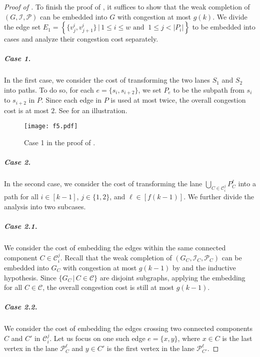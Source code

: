 \documentclass[11pt]{article}
\theoremstyle{definition}
\theoremstyle{remark}
\begin{document}
 \begin{proof}[Proof of ]
To finish the proof of , it suffices to show that the weak completion of $(G,\mathcal{I},\mathcal{P})$ can be embedded into $G$ with congestion at most $g(k)$. We divide the edge set $E_1 = \left\{ \{v_j^i, v_{j+1}^{i}\} \, | \, 1 \leq i \leq w \text{ and } \ 1 \leq j < |P_i| \right\}$ to be embedded into cases and analyze their congestion cost separately.

\subparagraph{Case 1.} In the first case, we consider the cost of transforming the two lanes $S_1$ and $S_2$ into paths. To do so, for each $e=\{s_{i}, s_{i+2}\}$, we set $P_e$ to be the subpath from $s_i$ to $s_{i+2}$ in $P$. Since each edge in $P$ is used at most twice, the overall congestion cost is at most $2$. See  for an illustration.
\begin{figure}[ht!]
    \centering
    \texttt{[image: f5.pdf]}
    \caption{Case 1 in the proof of .}
    \label{fig:f5}
\end{figure}


\subparagraph{Case 2.} In the second case, we consider the cost of transforming the lane $\bigcup_{C \in \mathcal{C}_i^j} {P}_C^\ell$ into a path for all $i \in [k-1]$, $j \in \{1,2\}$, and $\ell \in [f(k-1)]$. We further divide the analysis into two subcases. 

\subparagraph{Case 2.1.} We consider the cost of embedding the edges within the same connected component $C \in \mathcal{C}_i^j$. Recall that the weak completion of $(G_C,\mathcal{I}_C,\mathcal{P}_C)$ can be embedded into $G_C$ with congestion at most $g(k-1)$ by  and the inductive hypothesis. Since $\{G_C \, | \, C \in \mathcal{C} \}$ are disjoint subgraphs, applying the embedding for all $C \in \mathcal{C}$, the overall congestion cost is still at most $g(k-1)$.

\subparagraph{Case 2.2.} We consider the cost of embedding the edges crossing two connected components $C$ and $C'$ in $\mathcal{C}_i^j$. Let us focus on one such edge $e = \{x,y\}$, where $x \in C$ is the last vertex in the lane $\mathcal{P}_{C}^\ell$ and $y \in C'$ is the first vertex in the lane $\mathcal{P}_{C'}^\ell$. 


\end{proof}
\end{document}
